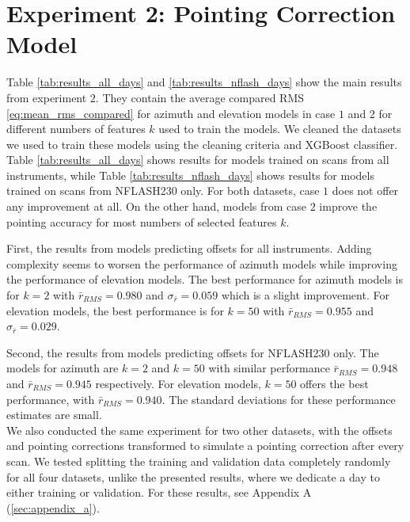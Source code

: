 \section{Experiment 2: Pointing Correction Model}
Table \ref{tab:results_all_days} and \ref{tab:results_nflash_days} show the main results from experiment $2$.
They contain the average compared RMS \eqref{eq:mean_rms_compared} for azimuth and elevation models in case $1$ and $2$ for different numbers of features $k$ used to train the models.
We cleaned the datasets we used to train these models using the cleaning criteria and XGBoost classifier.
Table \ref{tab:results_all_days} shows results for models trained on scans from all instruments, while Table \ref{tab:results_nflash_days} shows results for models
trained on scans from NFLASH230 only. For both datasets, case $1$ does not offer any improvement at all.
On the other hand, models from case $2$ improve the pointing accuracy for most numbers of selected features $k$.

First, the results from models predicting offsets for all instruments.
Adding complexity seems to worsen the performance of azimuth models while improving the performance of elevation models.
The best performance for azimuth models is for $k=2$ with $\bar{r}_{RMS}=0.980$ and $\sigma_{\bar{r}} = 0.059$ which is a slight improvement. 
For elevation models, the best performance is for $k=50$ with $\bar{r}_{RMS}=0.955$ and $\sigma_{\bar{r}} = 0.029$.

Second, the results from models predicting offsets for NFLASH230 only.
The models for azimuth are $k=2$ and $k=50$ with similar performance $\bar{r}_{RMS}=0.948$ and $\bar{r}_{RMS}=0.945$ respectively.
For elevation models, $k=50$ offers the best performance, with $\bar{r}_{RMS}=0.940$.
The standard deviations for these performance estimates are small.\\


We also conducted the same experiment for two other datasets, with the offsets and pointing corrections transformed to simulate a pointing correction after every scan.
We tested splitting the training and validation data completely randomly for all four datasets, unlike the presented results, where we dedicate a day to either training or validation.
For these results, see Appendix A (\ref{sec:appendix_a}). 

